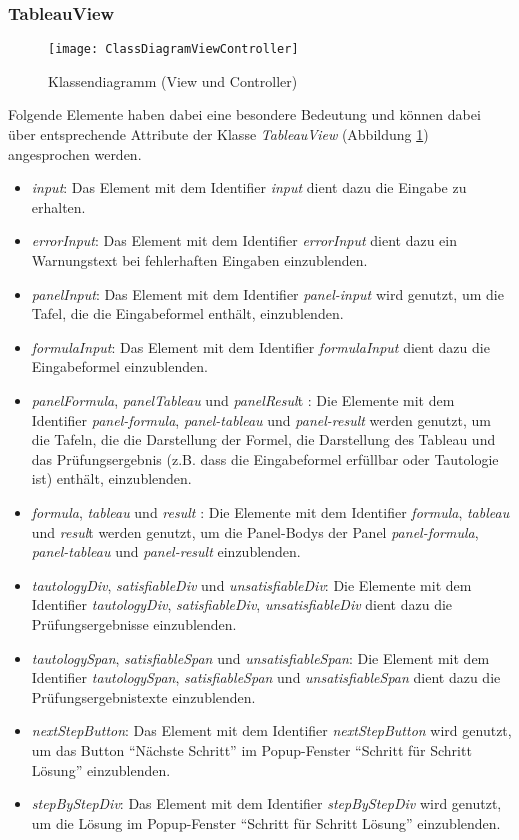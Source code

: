 \subsubsection{TableauView} \label{subsubsec:TableauView}
\begin{figure}[ !h] \centering
\texttt{[image: ClassDiagramViewController]}
\caption[KlassendiagrammControllerView]{Klassendiagramm (View und Controller)}\label{fig:KlassendiagrammControllerView}
\end{figure}
Folgende Elemente haben dabei eine besondere Bedeutung und können dabei über entsprechende Attribute der Klasse \textit{TableauView} (Abbildung \ref{fig:KlassendiagrammControllerView}) angesprochen werden.
\begin{itemize}
\item	\textit{input}: Das Element mit dem Identifier \textit{input} dient dazu die Eingabe zu erhalten.
\item	\textit{errorInput}: Das Element mit dem Identifier \textit{errorInput} dient dazu ein Warnungstext bei fehlerhaften Eingaben einzublenden.
\item	\textit{panelInput}: Das Element mit dem Identifier \textit{panel-input} wird genutzt, um die Tafel, die die Eingabeformel enthält, einzublenden.
\item	\textit{formulaInput}: Das Element mit dem Identifier \textit{ formulaInput} dient dazu die Eingabeformel einzublenden.
\item	\textit{panelFormula}, \textit{panelTableau} und\textit{ panelResul}t : Die Elemente mit dem Identifier \textit{panel-formula}, \textit{panel-tableau} und \textit{panel-result} werden genutzt, um die Tafeln, die die Darstellung der Formel, die Darstellung des Tableau und  das Prüfungsergebnis (z.B. dass die Eingabeformel erfüllbar oder Tautologie ist) enthält, einzublenden.
\item	\textit{formula}, \textit{tableau} und \textit{result} : Die Elemente mit dem Identifier \textit{formula}, \textit{tableau} und \textit{resul}t   werden genutzt, um die Panel-Bodys der Panel \textit{panel-formula}, \textit{panel-tableau} und \textit{panel-result} einzublenden.
\item	\textit{tautologyDiv},\textit{ satisfiableDiv} und \textit{unsatisfiableDiv}: Die Elemente mit dem Identifier \textit{tautologyDiv},  \textit{satisfiableDiv}, \textit{unsatisfiableDiv} dient dazu die Prüfungsergebnisse einzublenden.
\item	\textit{tautologySpan}, \textit{satisfiableSpan} und \textit{unsatisfiableSpan}:	Die Element mit dem Identifier  \textit{tautologySpan}, \textit{satisfiableSpan} und  \textit{unsatisfiableSpan} dient dazu die Prüfungsergebnistexte einzublenden.
\item	\textit{nextStepButton}: Das Element mit dem Identifier \textit{nextStepButton} wird genutzt, um das Button ``Nächste Schritt'' im Popup-Fenster ``Schritt für Schritt Lösung'' einzublenden.
\item	\textit{stepByStepDiv}: Das Element mit dem Identifier \textit{stepByStepDiv} wird genutzt, um die Lösung im Popup-Fenster ``Schritt für Schritt Lösung'' einzublenden.
\end{itemize}

